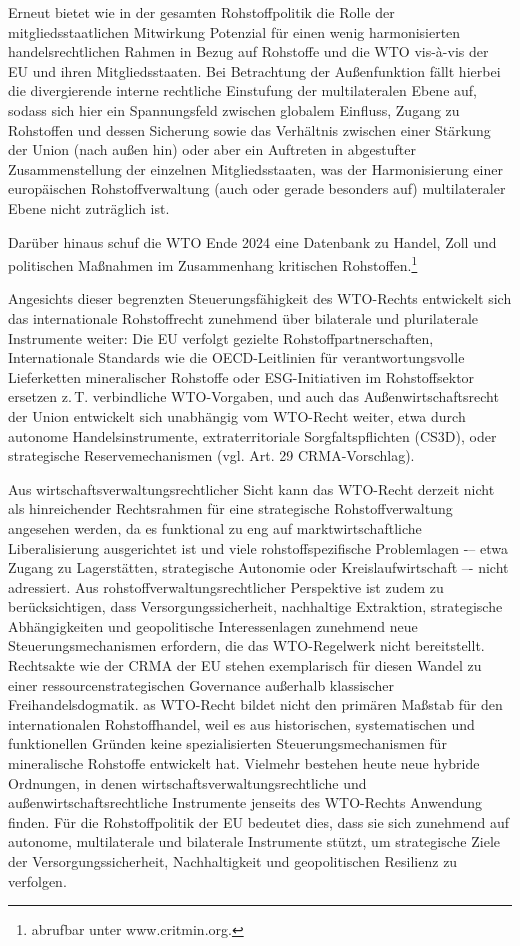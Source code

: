 \documentclass[12pt,a4paper,oneside]{book} %
\begin{document}
{{	Erneut bietet wie in der gesamten Rohstoffpolitik die Rolle der mitgliedsstaatlichen Mitwirkung Potenzial für einen wenig harmonisierten handelsrechtlichen Rahmen in Bezug auf Rohstoffe und die WTO vis-à-vis der EU und ihren Mitgliedsstaaten. Bei Betrachtung der Außenfunktion fällt hierbei die divergierende interne rechtliche Einstufung der multilateralen Ebene auf, sodass sich hier ein Spannungsfeld zwischen globalem Einfluss, Zugang zu Rohstoffen und dessen Sicherung sowie das Verhältnis zwischen einer Stärkung der Union (nach außen hin) oder aber ein Auftreten in abgestufter Zusammenstellung der einzelnen Mitgliedsstaaten,\autocite{Dauses/Ludwigs, Handbuch des EU-Wirtschaftsrechts, A. I., Rn. 43} was der Harmonisierung einer europäischen Rohstoffverwaltung (auch oder gerade besonders auf) multilateraler Ebene nicht zuträglich ist.
	
	Darüber hinaus schuf die WTO Ende 2024 eine Datenbank zu Handel, Zoll und politischen Maßnahmen im Zusammenhang kritischen Rohstoffen.\footnote{abrufbar unter www.critmin.org.}
	
	Angesichts dieser begrenzten Steuerungsfähigkeit des WTO-Rechts entwickelt sich das internationale Rohstoffrecht zunehmend über bilaterale und plurilaterale Instrumente weiter: Die EU verfolgt gezielte Rohstoffpartnerschaften, Internationale Standards wie die OECD-Leitlinien für verantwortungsvolle Lieferketten mineralischer Rohstoffe oder ESG-Initiativen im Rohstoffsektor ersetzen z. T. verbindliche WTO-Vorgaben, und auch das Außenwirtschaftsrecht der Union entwickelt sich unabhängig vom WTO-Recht weiter, etwa durch autonome Handelsinstrumente, extraterritoriale Sorgfaltspflichten (CS3D), oder strategische Reservemechanismen (vgl. Art. 29 CRMA-Vorschlag).
	
	Aus wirtschaftsverwaltungsrechtlicher Sicht kann das WTO-Recht derzeit nicht als hinreichender Rechtsrahmen für eine strategische Rohstoffverwaltung angesehen werden, da es funktional zu eng auf marktwirtschaftliche Liberalisierung ausgerichtet ist und viele rohstoffspezifische Problemlagen -– etwa Zugang zu Lagerstätten, strategische Autonomie oder Kreislaufwirtschaft –- nicht adressiert. Aus rohstoffverwaltungsrechtlicher Perspektive ist zudem zu berücksichtigen, dass Versorgungssicherheit, nachhaltige Extraktion, strategische Abhängigkeiten und geopolitische Interessenlagen zunehmend neue Steuerungsmechanismen erfordern, die das WTO-Regelwerk nicht bereitstellt. Rechtsakte wie der CRMA der EU stehen exemplarisch für diesen Wandel zu einer ressourcenstrategischen Governance außerhalb klassischer Freihandelsdogmatik. as WTO-Recht bildet nicht den primären Maßstab für den internationalen Rohstoffhandel, weil es aus historischen, systematischen und funktionellen Gründen keine spezialisierten Steuerungsmechanismen für mineralische Rohstoffe entwickelt hat. Vielmehr bestehen heute neue hybride Ordnungen, in denen wirtschaftsverwaltungsrechtliche und außenwirtschaftsrechtliche Instrumente jenseits des WTO-Rechts Anwendung finden. Für die Rohstoffpolitik der EU bedeutet dies, dass sie sich zunehmend auf autonome, multilaterale und bilaterale Instrumente stützt, um strategische Ziele der Versorgungssicherheit, Nachhaltigkeit und geopolitischen Resilienz zu verfolgen.
	
}}
\end{document}

